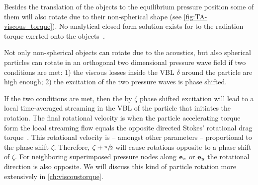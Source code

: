 Besides the translation of the objects to the equilibrium pressure position 
some of them will also rotate due to their non-spherical shape (see 
\cref{fig:TA-viscous_torque}). No analytical closed form solution exists for to 
the radiation torque exerted onto the objects~\cite{Lamprecht2017}.


Not only non-spherical objects can rotate due to the acoustics, but also 
spherical particles can rotate in an orthogonal two dimensional pressure wave 
field if two conditions are met: 1) the viscous losses inside the VBL $\delta$ 
around the particle are high enough; 2) the excitation of the two pressure 
waves is phase shifted.

If the two conditions are met, then the by $\zeta$ phase shifted excitation 
will lead to a local time-averaged streaming in the VBL of the particle that 
initiates the rotation. The final rotational velocity is when the particle 
accelerating torque form the local streaming flow equals the opposite directed 
Stokes' rotational drag torque~\cite{Lamprecht2017}. This rotational velocity 
is -- amongst other parameters -- proportional to the phase shift $\zeta$. 
Therefore, $\zeta + \sfrac{\pi}{2}$ will cause rotations opposite to a phase 
shift of $\zeta$. For neighboring superimposed pressure nodes along $\vb{e}_{x}$ or 
$\vb{e}_{y}$ the rotational direction is also opposite. We will discuss this kind of 
particle rotation more extensively in \cref{ch:viscoustorque}.

